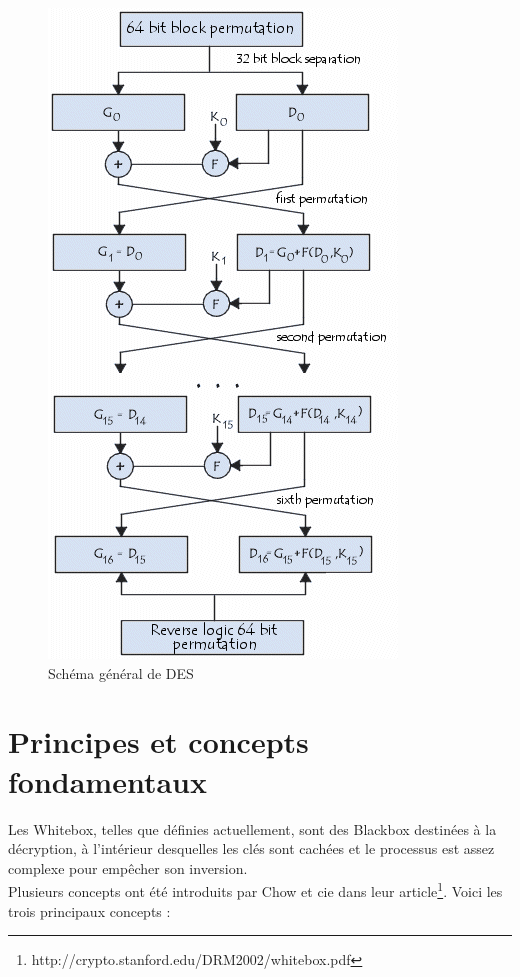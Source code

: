 \documentclass[a4paper,12pt]{article}
\begin{document}
\clearpage

\begin{figure}[h]
\centering
\includegraphics[scale=0.80]{./images/DES_diagram.png}
\caption{Schéma général de DES}
\label{fig:DES-diagram}
\end{figure}

\clearpage

\section{Principes et concepts fondamentaux}

Les Whitebox, telles que définies actuellement, sont des Blackbox destinées à la décryption, à l'intérieur desquelles les clés sont cachées et le processus est assez complexe pour empêcher son inversion.\\
Plusieurs concepts ont été introduits par Chow et cie dans leur article\footnote{http://crypto.stanford.edu/DRM2002/whitebox.pdf}. Voici les trois principaux concepts :
\end{document}
